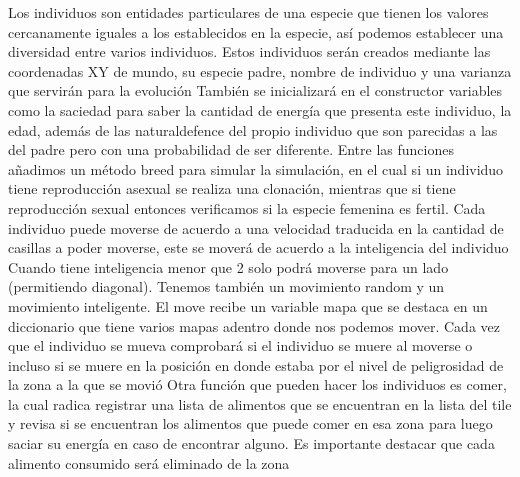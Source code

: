 \documentclass{llncs}
\begin{document}
Los individuos son entidades particulares de una especie que tienen los valores cercanamente iguales a los establecidos en la especie, así podemos establecer una diversidad entre varios individuos.
\newline
\newline
Estos individuos serán creados mediante las coordenadas XY de mundo, su especie padre, nombre de individuo y una varianza que servirán para la evolución
\newline
\newline
También se inicializará en el constructor variables como la saciedad para saber la cantidad de energía que presenta este individuo, la edad, además de las naturaldefence del propio individuo que son parecidas a las del padre pero con una probabilidad de ser diferente.
\newline
\newline
Entre las funciones añadimos un método breed para simular la simulación, en el cual si un individuo tiene reproducción asexual se realiza una clonación, mientras que si tiene reproducción sexual entonces verificamos si la especie femenina es fertil.
\newline
\newline
Cada individuo puede moverse de acuerdo a una velocidad traducida en la cantidad de casillas a poder moverse, este se moverá de acuerdo a la inteligencia del individuo
\newline
\newline
Cuando tiene inteligencia menor que 2 solo podrá moverse para un lado (permitiendo diagonal).
\newline
\newline
Tenemos también un movimiento random y un movimiento inteligente.
\newline
\newline
El move recibe un variable mapa que se destaca en un diccionario que tiene varios mapas adentro donde nos podemos mover.
\newline
\newline
Cada vez que el individuo se mueva comprobará si el individuo se muere al moverse o incluso si se muere en la posición en donde estaba por el nivel de peligrosidad de la zona a la que se movió
\newline
\newline
Otra función que pueden hacer los individuos es comer, la cual radica registrar una lista de alimentos que se encuentran en la lista del tile y revisa si se encuentran los alimentos que puede comer en esa zona para luego saciar su energía en caso de encontrar alguno. Es importante destacar que cada alimento consumido será eliminado de la zona
\end{document}
